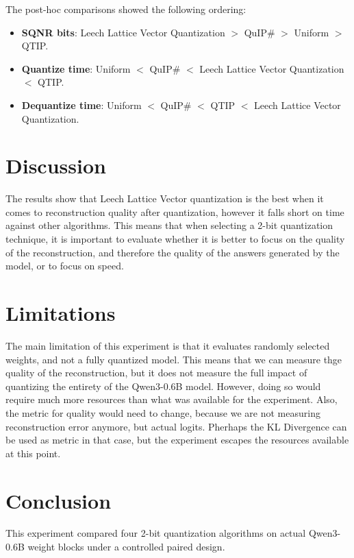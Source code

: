 \documentclass[11pt]{article}
\begin{document}
The post-hoc comparisons showed the following ordering:

\begin{itemize}
    \item \textbf{SQNR bits}: Leech Lattice Vector Quantization $>$ QuIP\# $>$ Uniform $>$ QTIP.
    \item \textbf{Quantize time}: Uniform $<$ QuIP\# $<$ Leech Lattice Vector Quantization $<$ QTIP.
    \item \textbf{Dequantize time}: Uniform $<$ QuIP\# $<$ QTIP $<$ Leech Lattice Vector Quantization.
\end{itemize}

\section{Discussion}

The results show that Leech Lattice Vector quantization is the best when it comes to reconstruction quality after quantization, however it falls short on time against other algorithms. 
This means that when selecting a 2-bit quantization technique, it is important to evaluate whether it is better to focus on the quality of the reconstruction, and therefore the
quality of the answers generated by the model, or to focus on speed.

\section{Limitations}

The main limitation of this experiment is that it evaluates randomly selected weights, and not a fully quantized model.
This means that we can measure thge quality of the reconstruction, but it does not measure the full impact of quantizing the entirety of the Qwen3-0.6B model.
However, doing so would require much more resources than what was available for the experiment. Also, the metric for quality would need to change, because we are not
measuring reconstruction error anymore, but actual logits. Pherhaps the KL Divergence can be used as metric in that case, but the experiment escapes the resources available 
at this point.

\section{Conclusion}

This experiment compared four 2-bit quantization algorithms on actual Qwen3-0.6B weight blocks under a controlled paired design.
\end{document}
